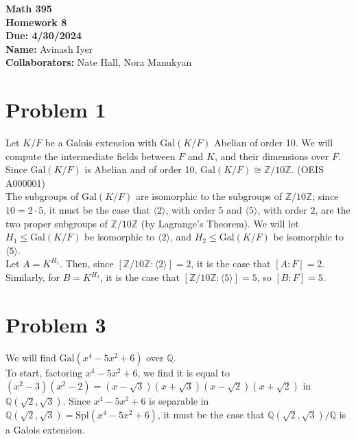 \documentclass[10pt]{extarticle}
\title{}
\author{}
\date{}
\newcommand{\Q}{\mathbb{Q}}
\newcommand{\Z}{\mathbb{Z}}
\begin{document}
  \begin{center}
    {\bf \Large Math 395 \\[0.1in]Homework 8 \\[0.1in]
    Due: 4/30/2024}\\[.25in]
    {\bf Name:} {Avinash Iyer}\\[0.15in]
    {\bf Collaborators:} {Nate Hall, Nora Manukyan} \\
  \end{center}
  \section{Problem 1}%
  Let $K/F$ be a Galois extension with $\text{Gal}(K/F)$ Abelian of order 10. We will compute the intermediate fields between $F$ and $K$, and their dimensions over $F$.\\

  Since $\text{Gal}(K/F)$ is Abelian and of order 10, $\text{Gal}(K/F)\cong \Z/10\Z$. {\tiny (OEIS A000001)}\\

  The subgroups of $\text{Gal}(K/F)$ are isomorphic to the subgroups of $\Z/10\Z$; since $10 = 2\cdot 5$, it must be the case that $\langle 2 \rangle$, with order $5$ and $\langle 5 \rangle$, with order $2$, are the two proper subgroups of $\Z/10\Z$ (by Lagrange's Theorem). We will let $H_1 \leq \text{Gal}(K/F)$ be isomorphic to $\langle 2 \rangle$, and $H_2 \leq \text{Gal}(K/F)$ be isomorphic to $\langle 5 \rangle$.\\

  Let $A = K^{H_1}$. Then, since $[\Z/10\Z : \langle 2 \rangle] = 2$, it is the case that $[A:F] = 2$. Similarly, for $B = K^{H_2}$, it is the case that $[\Z/10\Z : \langle 5 \rangle] = 5$, so $[B:F] = 5$.
  \section{Problem 3}%
  We will find $\text{Gal}(x^4 - 5x^2 + 6)$ over $\Q$.\\

  To start, factoring $x^4 - 5x^2 + 6$, we find it is equal to $(x^2 - 3)(x^2 - 2) = (x-\sqrt{3})(x+\sqrt{3})(x-\sqrt{2})(x+\sqrt{2})$ in $\Q(\sqrt{2},\sqrt{3})$. Since $x^4 - 5x^2 + 6$ is separable in $\Q(\sqrt{2},\sqrt{3}) = \text{Spl}(x^4 - 5x^2 + 6)$, it must be the case that $\Q(\sqrt{2},\sqrt{3})/\Q$ is a Galois extension.\\
\end{document}
